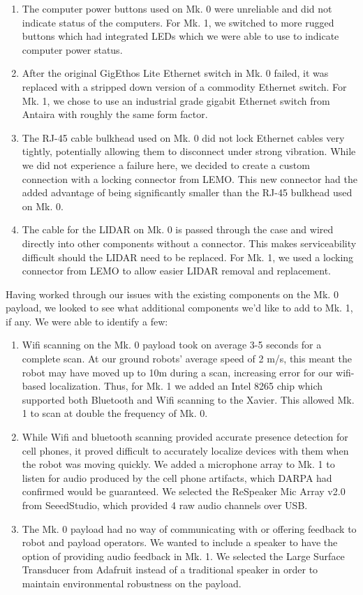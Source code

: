 \begin{enumerate}
	\item The computer power buttons used on Mk. 0 were unreliable and did not indicate status of the computers. For Mk. 1, we switched to more rugged buttons which had integrated LEDs which we were able to use to indicate computer power status.
	\item After the original GigEthos Lite Ethernet switch in Mk. 0 failed, it was replaced with a stripped down version of a commodity Ethernet switch. For Mk. 1, we chose to use an industrial grade gigabit Ethernet switch from Antaira with roughly the same form factor.
	\item The RJ-45 cable bulkhead used on Mk. 0 did not lock Ethernet cables very tightly, potentially allowing them to disconnect under strong vibration. While we did not experience a failure here, we decided to create a custom connection with a locking connector from LEMO. This new connector had the added advantage of being significantly smaller than the RJ-45 bulkhead used on Mk. 0.
	\item The cable for the LIDAR on Mk. 0 is passed through the case and wired directly into other components without a connector. This makes serviceability difficult should the LIDAR need to be replaced. For Mk. 1, we used a locking connector from LEMO to allow easier LIDAR removal and replacement.
\end{enumerate}

Having worked through our issues with the existing components on the Mk. 0 payload, we looked to see what additional components we'd like to add to Mk. 1, if any. We were able to identify a few:

\begin{enumerate}
	\item Wifi scanning on the Mk. 0 payload took on average 3-5 seconds for a complete scan. At our ground robots' average speed of 2 m/s, this meant the robot may have moved up to 10m during a scan, increasing error for our wifi-based localization. Thus, for Mk. 1 we added an Intel 8265 chip which supported both Bluetooth and Wifi scanning to the Xavier. This allowed Mk. 1 to scan at double the frequency of Mk. 0.
	\item While Wifi and bluetooth scanning provided accurate presence detection for cell phones, it proved difficult to accurately localize devices with them when the robot was moving quickly. We added a microphone array to Mk. 1 to listen for audio produced by the cell phone artifacts, which DARPA had confirmed would be guaranteed. We selected the ReSpeaker Mic Array v2.0 from SeeedStudio, which provided 4 raw audio channels over USB.
	\item The Mk. 0 payload had no way of communicating with or offering feedback to robot and payload operators. We wanted to include a speaker to have the option of providing audio feedback in Mk. 1. We selected the Large Surface Transducer from Adafruit instead of a traditional speaker in order to maintain environmental robustness on the payload.		
\end{enumerate}

